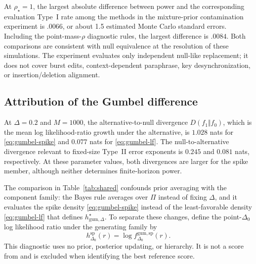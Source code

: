 \documentclass[11pt]{article}
\begin{document}
At $\rho_\star=1$, the largest absolute difference between power and the corresponding evaluation Type~I rate among the methods in the mixture-prior contamination experiment is $.0066$, or about 1.5 estimated Monte Carlo standard errors.  Including the point-mass-$\rho$ diagnostic rules, the largest difference is $.0084$.  Both comparisons are consistent with null equivalence at the resolution of these simulations.  The experiment evaluates only independent null-like replacement; it does not cover burst edits, context-dependent paraphrase, key desynchronization, or insertion/deletion alignment.

\FloatBarrier
\subsection{Attribution of the Gumbel difference}
\label{sec:family}

At $\Delta=0.2$ and $M=1000$, the alternative-to-null divergence $D(f_1\Vert f_0)$, which is the mean log likelihood-ratio growth under the alternative, is $1.028$ nats for \eqref{eq:gumbel-spike} and $0.077$ nats for \eqref{eq:gumbel-lf}.  The null-to-alternative divergence relevant to fixed-size Type~II error exponents is $0.245$ and $0.081$ nats, respectively.  At these parameter values, both divergences are larger for the spike member, although neither determines finite-horizon power.

The comparison in Table~\ref{tab:shared} confounds prior averaging with the component family: the Bayes rule averages over $\Pi$ instead of fixing $\Delta$, and it evaluates the spike density \eqref{eq:gumbel-spike} instead of the least-favorable density \eqref{eq:gumbel-lf} that defines $h^\star_{\mathrm{gum},\Delta}$.  To separate these changes, define the point-$\Delta_0$ log likelihood ratio under the generating family by
\begin{equation}
  h^{\mathrm{sp}}_{\Delta_0}(r)
  =\log f_{\Delta_0}^{\mathrm{gum},\mathrm{sp}}(r).
  \label{eq:spike-point}
\end{equation}
This diagnostic uses no prior, posterior updating, or hierarchy.  It is not a score from \citet{li2025framework} and is excluded when identifying the best reference score.
\end{document}
